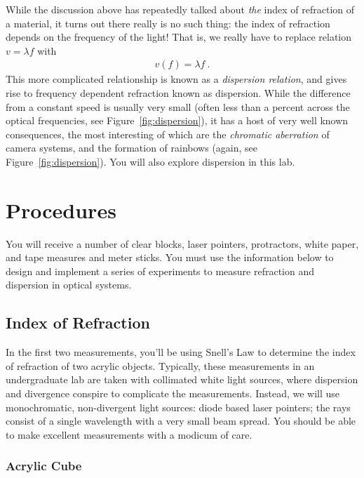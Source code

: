 \documentclass[12pt]{article}
\begin{document}
While the discussion above has repeatedly talked about \textit{the}
index of refraction of a material, it turns out there really is no
such thing: the index of refraction depends on the frequency of the
light!  That is, we really have to replace relation $v = \lambda f$
with
\begin{gather*}
  v(f) = \lambda f\ .
\end{gather*}
This more complicated relationship is known as a \textit{dispersion
  relation}, and gives rise to frequency dependent refraction known as
dispersion.  While the difference from a constant speed is usually
very small (often less than a percent across the optical frequencies,
see Figure~\ref{fig:dispersion}), it has a host of very well known
consequences, the most interesting of which are the \textit{chromatic
  aberration} of camera systems, and the formation of rainbows (again,
see Figure~\ref{fig:dispersion}).  You will also explore dispersion in
this lab.

\section{Procedures}
\label{sec:procedures}

You will receive a number of clear blocks, laser pointers,
protractors, white paper, and tape measures and meter sticks.  You
must use the information below to design and implement a series of
experiments to measure refraction and dispersion in optical systems. 

\subsection{Index of Refraction}
\label{sec:index}

In the first two measurements, you'll be using Snell's Law to
determine the index of refraction of two acrylic objects.  Typically,
these measurements in an undergraduate lab are taken with collimated
white light sources, where dispersion and divergence conspire to
complicate the measurements.  Instead, we will use monochromatic,
non-divergent light sources: diode based laser pointers; the rays
consist of a single wavelength with a very small beam spread.  You
should be able to make excellent measurements with a modicum of care.

\subsubsection{Acrylic Cube}
\label{sec:cube}
\end{document}
